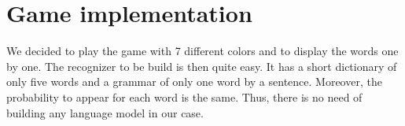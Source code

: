 \section*{Game implementation}
We decided to play the game with 7 different colors and to display the words one by one. The recognizer to be build is then quite easy. It has a short dictionary of only five words and a grammar of only one word by a sentence. Moreover, the probability to appear for each word is the same. Thus, there is no need of building any language model in our case.

